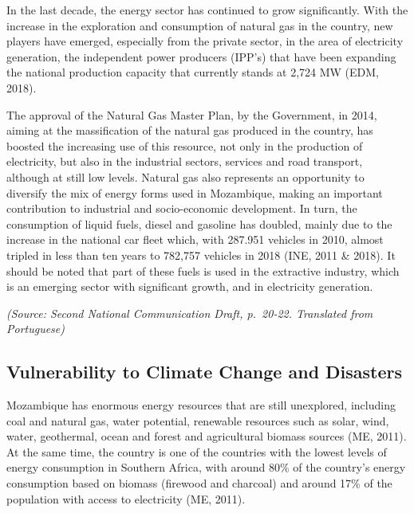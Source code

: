 \documentclass[
]{book}
\begin{document}
In the last decade, the energy sector has continued to grow significantly. With the increase in the exploration and consumption of natural gas in the country, new players have emerged, especially from the private sector, in the area of electricity generation, the independent power producers (IPP's) that have been expanding the national production capacity that currently stands at 2,724 MW (EDM, 2018).

The approval of the Natural Gas Master Plan, by the Government, in 2014, aiming at the massification of the natural gas produced in the country, has boosted the increasing use of this resource, not only in the production of electricity, but also in the industrial sectors, services and road transport, although at still low levels. Natural gas also represents an opportunity to diversify the mix of energy forms used in Mozambique, making an important contribution to industrial and socio-economic development. In turn, the consumption of liquid fuels, diesel and gasoline has doubled, mainly due to the increase in the national car fleet which, with 287.951 vehicles in 2010, almost tripled in less than ten years to 782,757 vehicles in 2018 (INE, 2011 \& 2018). It should be noted that part of these fuels is used in the extractive industry, which is an emerging sector with significant growth, and in electricity generation.

\emph{(Source: Second National Communication Draft, p.~20-22. Translated from Portuguese)}

\hypertarget{vulnerability-to-climate-change-and-disasters-5}{%
\subsection{Vulnerability to Climate Change and Disasters}\label{vulnerability-to-climate-change-and-disasters-5}}

Mozambique has enormous energy resources that are still unexplored, including coal and natural gas, water potential, renewable resources such as solar, wind, water, geothermal, ocean and forest and agricultural biomass sources (ME, 2011). At the same time, the country is one of the countries with the lowest levels of energy consumption in Southern Africa, with around 80\% of the country's energy consumption based on biomass (firewood and charcoal) and around 17\% of the population with access to electricity (ME, 2011).
\end{document}
